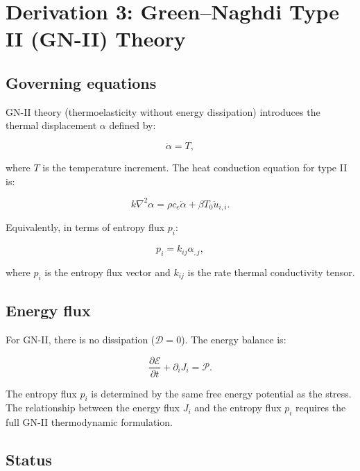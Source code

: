 \section{Derivation 3: Green--Naghdi Type II (GN-II) Theory}

\subsection{Governing equations}

GN-II theory (thermoelasticity without energy dissipation) introduces the thermal displacement $\alpha$ defined by:

\begin{equation}
\dot{\alpha} = T,
\label{ef:gn2:1}
\end{equation}

where $T$ is the temperature increment. The heat conduction equation for type II is:

\begin{equation}
k\nabla^2\alpha = \rho c_e \ddot{\alpha} + \beta T_0 \ddot{u}_{i,i}.
\label{ef:gn2:2}
\end{equation}

Equivalently, in terms of entropy flux $p_i$:

\begin{equation}
p_i = k_{ij}\alpha_{,j},
\label{ef:gn2:3}
\end{equation}

where $p_i$ is the entropy flux vector and $k_{ij}$ is the rate thermal conductivity tensor.

\subsection{Energy flux}

For GN-II, there is no dissipation ($\mathcal{D} = 0$). The energy balance is:

\begin{equation}
\frac{\partial\mathcal{E}}{\partial t} + \partial_i J_i = \mathcal{P}.
\label{ef:gn2:4}
\end{equation}

The entropy flux $p_i$ is determined by the same free energy potential as the stress. The relationship between the energy flux $J_i$ and the entropy flux $p_i$ requires the full GN-II thermodynamic formulation.

\subsection{Status}

